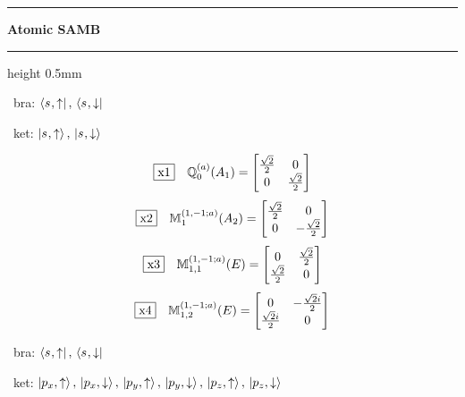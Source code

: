 \documentclass[fleqn,10pt,landscape]{jsarticle}
\begin{document}
\vspace{5mm}
\noindent \rule[0.5mm]{5mm}{0.5mm}\hspace{3mm}\textbf{Atomic SAMB}\hspace{3mm}\leaders\hrule height 0.5mm\hfill\kern0pt
\vspace{3mm}

\vspace{5mm}

\noindent\textbullet\, bra: $\bra{s_{},\uparrow},\, \bra{s_{},\downarrow}$

\noindent\textbullet\, ket: $\ket{s_{},\uparrow},\, \ket{s_{},\downarrow}$

\begin{dmath*}
\fbox{x1}\quad \mathbb{Q}_{0}^{(a)}(A_{1})=\begin{bmatrix} \frac{\sqrt{2}}{2} & 0 \\ 0 & \frac{\sqrt{2}}{2} \end{bmatrix}
\end{dmath*}
\begin{dmath*}
\fbox{x2}\quad \mathbb{M}_{1}^{(1,-1;a)}(A_{2})=\begin{bmatrix} \frac{\sqrt{2}}{2} & 0 \\ 0 & - \frac{\sqrt{2}}{2} \end{bmatrix}
\end{dmath*}
\begin{dmath*}
\fbox{x3}\quad \mathbb{M}_{1,1}^{(1,-1;a)}(E)=\begin{bmatrix} 0 & \frac{\sqrt{2}}{2} \\ \frac{\sqrt{2}}{2} & 0 \end{bmatrix}
\end{dmath*}
\begin{dmath*}
\fbox{x4}\quad \mathbb{M}_{1,2}^{(1,-1;a)}(E)=\begin{bmatrix} 0 & - \frac{\sqrt{2} i}{2} \\ \frac{\sqrt{2} i}{2} & 0 \end{bmatrix}
\end{dmath*}
\vspace{5mm}

\noindent\textbullet\, bra: $\bra{s_{},\uparrow},\, \bra{s_{},\downarrow}$

\noindent\textbullet\, ket: $\ket{p_{x},\uparrow},\, \ket{p_{x},\downarrow},\, \ket{p_{y},\uparrow},\, \ket{p_{y},\downarrow},\, \ket{p_{z},\uparrow},\, \ket{p_{z},\downarrow}$
\end{document}
